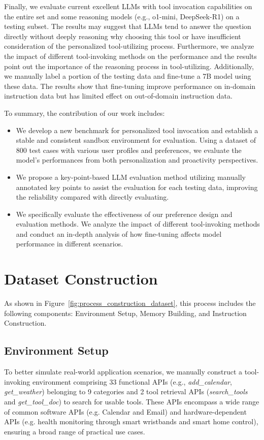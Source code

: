 \documentclass[11pt]{article}
\begin{document}
Finally, we evaluate current excellent LLMs with tool invocation capabilities on the entire set and some reasoning models (e.g., o1-mini, DeepSeek-R1) on a testing subset. The results may suggest that LLMs tend to answer the question directly without deeply reasoning why choosing this tool or have insufficient consideration of the personalized tool-utilizing process. Furthermore, we analyze the impact of different tool-invoking methods on the performance and the results point out the importance of the reasoning process in tool-utilizing. Additionally, we manually label a portion of the testing data and fine-tune a 7B model using these data. The results show that fine-tuning improve performance on in-domain instruction data but has limited effect on out-of-domain instruction data. 






To summary, the contribution of our work includes:
\begin{itemize}
    \item We develop a new benchmark for personalized tool invocation and establish a stable and consistent sandbox environment for evaluation. Using a dataset of 800 test cases with various user profiles and preferences, we evaluate the model's performances from both personalization and proactivity perspectives.
    \item We propose a key-point-based LLM evaluation method utilizing manually annotated key points to assist the evaluation for each testing data, improving the reliability compared with directly evaluating. 
    \item We specifically evaluate the effectiveness of our preference design and evaluation methods. We analyze the impact of different tool-invoking methods and conduct an in-depth analysis of how fine-tuning affects model performance in different scenarios.
\end{itemize}





\section{Dataset Construction}
As shown in Figure~\ref{fig:process_construction_dataset}, this process includes the following components: Environment Setup, Memory Building, and Instruction Construction.



\subsection{Environment Setup}
To better simulate real-world application scenarios, we manually construct a tool-invoking environment comprising 33 functional APIs (e.g., \textit{add\_calendar}, \textit{get\_weather}) belonging to 9 categories and 2 tool retrieval APIs (\textit{search\_tools} and \textit{get\_tool\_doc}) to search for usable tools. These APIs encompass a wide range of common software APIs (e.g. Calendar and Email) and hardware-dependent APIs (e.g. health monitoring through smart wristbands and smart home control), ensuring a broad range of practical use cases.
\end{document}
